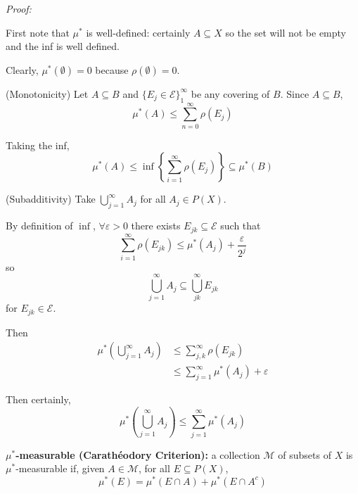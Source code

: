 \documentclass[12pt]{report}
\newcommand{\ep}{\varepsilon}
\newcommand{\Ec}{\mathcal{E}}
\newcommand{\M}{\mathcal{M}}
\newcommand{\sub}{\subseteq}
\newenvironment*{tbox}[2][gray]{
    \begin{tcolorbox}[
        parbox=false,
        colback=#1!5!white,
        colframe=#1!75!black,
        breakable,
        title={#2}
    ]}
    {\end{tcolorbox}}
\begin{document}
        \begin{tbox}{\textbf{Proposition:} Let $\Ec \sub P(X)$ such that $X, \emptyset \in \Ec$. Define $\rho: \Ec \to [0, \infty]$ with $\rho(\emptyset) = 0$. $\forall A \sub P(X)$, let
            \[\mu^*(A) = \inf\left\{\sum_{i=0}^\infty \rho(E_j) \bigg\vert E_j \in \Ec, \; A \sub \bigcup_{j=1}^\infty E_j\right\}\]
            (i.e. take the inf of the sum of all coverings of $A$). Then $\mu^*$ is an outer measure.}
            
            \emph{Proof:}
            
            First note that $\mu^*$ is well-defined: certainly $A \sub X$ so the set will not be empty and the inf is well defined. 

            Clearly, $\mu^*(\emptyset) = 0$ because $\rho(\emptyset) = 0$.

            (Monotonicity) Let $A \sub B$ and $\{E_j \in \Ec\}_1^{\infty}$ be any covering of $B$. Since $A \sub B$, 
            \[\mu^*(A) \leq \sum_{n=0}^\infty \rho(E_j)\]

            Taking the inf, 
            \[\mu^*(A) \leq \inf\left\{\sum_{i=1}^{\infty} \rho(E_j)\right\} \sub \mu^*(B)\]

            (Subadditivity) Take $\bigcup_{j=1}^{\infty} A_j$ for all $A_j \in P(X)$. 

            By definition of $\inf$, $\forall \ep > 0$ there exists $E_{jk} \sub \Ec$ such that  
            \[\sum_{i=1}^{\infty} \rho(E_{jk}) \leq \mu^*(A_j) + \frac{\ep}{2^j}\]
            so 
            \[\bigcup_{j=1}^{\infty} A_j \sub \bigcup_{jk}^{\infty} E_{jk}\]
            for $E_{jk} \in \Ec$. 

            Then 
            \begin{align*}
                \mu^*\left(\bigcup_{j=1}^\infty A_j\right) &\leq \sum_{j, k}^\infty  \rho(E_{jk})\\ 
                    &\leq \sum_{j=1}^{\infty} \mu^*(A_j) + \ep
            \end{align*}

            Then certainly, 
            \[\mu^*\left(\bigcup_{j=1}^\infty A_j\right) \leq \sum_{j=1}^\infty \mu^*(A_j)\]
        \end{tbox}

        \textbf{$\mu^*$-measurable (Carathéodory Criterion):} a collection $\M$ of subsets of $X$ is $\mu^*$-measurable if, given $A \in \M$, for all $E \sub P(X)$,
        \[\mu^*(E) = \mu^*(E \cap A) + \mu^*(E \cap A^c)\]
\end{document}
